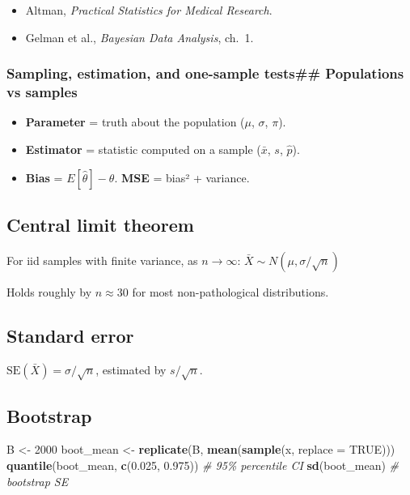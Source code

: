 \documentclass[
]{article}
\newenvironment{Shaded}{\begin{snugshade}}{\end{snugshade}}
\newcommand{\AttributeTok}[1]{\textcolor[rgb]{0.13,0.29,0.53}{#1}}
\newcommand{\CommentTok}[1]{\textcolor[rgb]{0.56,0.35,0.01}{\textit{#1}}}
\newcommand{\ConstantTok}[1]{\textcolor[rgb]{0.56,0.35,0.01}{#1}}
\newcommand{\DecValTok}[1]{\textcolor[rgb]{0.00,0.00,0.81}{#1}}
\newcommand{\FloatTok}[1]{\textcolor[rgb]{0.00,0.00,0.81}{#1}}
\newcommand{\FunctionTok}[1]{\textcolor[rgb]{0.13,0.29,0.53}{\textbf{#1}}}
\newcommand{\NormalTok}[1]{#1}
\newcommand{\OtherTok}[1]{\textcolor[rgb]{0.56,0.35,0.01}{#1}}
\providecommand{\tightlist}{%
  \setlength{\itemsep}{0pt}\setlength{\parskip}{0pt}}
\begin{document}
\begin{itemize}
\tightlist
\item
  Altman, \emph{Practical Statistics for Medical Research}.
\item
  Gelman et al., \emph{Bayesian Data Analysis}, ch.~1.
\end{itemize}

\subsubsection{Sampling, estimation, and one-sample tests\#\#
Populations vs
samples}\label{sampling-estimation-and-one-sample-tests-populations-vs-samples}

\begin{itemize}
\tightlist
\item
  \textbf{Parameter} = truth about the population (\(\mu\), \(\sigma\),
  \(\pi\)).
\item
  \textbf{Estimator} = statistic computed on a sample (\(\bar x\),
  \(s\), \(\hat p\)).
\item
  \textbf{Bias} = \(E[\hat\theta] - \theta\). \textbf{MSE} = bias² +
  variance.
\end{itemize}

\subsection{Central limit theorem}\label{central-limit-theorem}

For iid samples with finite variance, as \(n \to \infty\):
\(\bar X \sim N\!\left(\mu, \sigma / \sqrt n\right)\)

Holds roughly by \(n \approx 30\) for most non-pathological
distributions.

\subsection{Standard error}\label{standard-error}

\(\mathrm{SE}(\bar X) = \sigma / \sqrt n\), estimated by
\(s / \sqrt n\).

\subsection{Bootstrap}\label{bootstrap}

\begin{Shaded}
\begin{Highlighting}[]
\NormalTok{B }\OtherTok{\textless{}{-}} \DecValTok{2000}
\NormalTok{boot\_mean }\OtherTok{\textless{}{-}} \FunctionTok{replicate}\NormalTok{(B, }\FunctionTok{mean}\NormalTok{(}\FunctionTok{sample}\NormalTok{(x, }\AttributeTok{replace =} \ConstantTok{TRUE}\NormalTok{)))}
\FunctionTok{quantile}\NormalTok{(boot\_mean, }\FunctionTok{c}\NormalTok{(}\FloatTok{0.025}\NormalTok{, }\FloatTok{0.975}\NormalTok{))   }\CommentTok{\# 95\% percentile CI}
\FunctionTok{sd}\NormalTok{(boot\_mean)                           }\CommentTok{\# bootstrap SE}
\end{Highlighting}
\end{Shaded}
\end{document}
